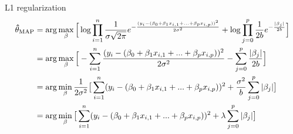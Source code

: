 L1 regularization 
\begin{equation}
    \begin{split}
    {\bf \hat{\theta}_{\text{MAP}}} & = \arg\max_{\bf \beta} \Big[ \log \prod_{i=1}^{n} \frac{1}{\sigma\sqrt{2\pi}}e^{-\frac{(y_i- (\beta_0 + \beta_1 x_{i,1} + ... + \beta_p x_{i,p}))^2}{2\sigma^2}} + \log \prod_{j=0}^{p} \frac{1}{2b}e^{-\frac{|\beta_j|}{2b}} \Big] \\
&= \arg\max_{\bf \beta} \Big[- \sum_{i=1}^{n} {\frac{(y_i- (\beta_0 + \beta_1 x_{i,1} + ... + \beta_p x_{i,p}))^2}{2\sigma^2}} - \sum_{j=0}^{p} {\frac{|\beta_j|}{2b}} \Big]\\
&= \arg\min_{\bf \beta} \frac{1}{2\sigma^2} \big[ \sum_{i=1}^{n} (y_i-(\beta_0 + \beta_1 x_{i,1} + ... + \beta_p x_{i,p}))^2 + \frac{\sigma^2}{b} \sum_{j=0}^{p} |\beta_j| \big] \\
&= \arg\min_{\bf \beta} \big[ \sum_{i=1}^{n} (y_i-(\beta_0 + \beta_1 x_{i,1} + ... + \beta_p x_{i,p}))^2 + \lambda \sum_{j=0}^{p} |\beta_j| \big]
\end{split}
 \end{equation}
